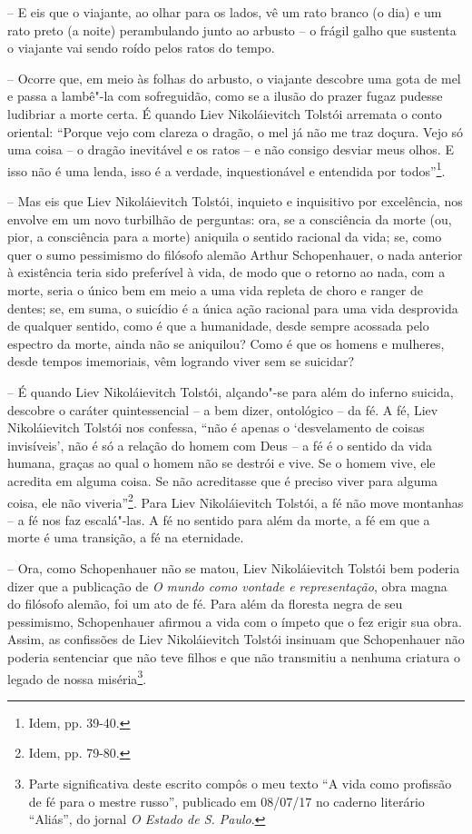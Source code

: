 -- E eis que o viajante, ao olhar para os lados, vê um rato branco (o
dia) e um rato preto (a noite) perambulando junto ao arbusto -- o frágil
galho que sustenta o viajante vai sendo roído pelos ratos do tempo.

-- Ocorre que, em meio às folhas do arbusto, o viajante descobre uma
gota de mel e passa a lambê"-la com sofreguidão, como se a ilusão do
prazer fugaz pudesse ludibriar a morte certa. É quando Liev
Nikoláievitch Tolstói arremata o conto oriental: ``Porque vejo com
clareza o dragão, o mel já não me traz doçura. Vejo só uma coisa -- o
dragão inevitável e os ratos -- e não consigo desviar meus olhos. E isso
não é uma lenda, isso é a verdade, inquestionável e entendida por
todos''\footnote{Idem, pp. 39-40.}.

-- Mas eis que Liev Nikoláievitch Tolstói, inquieto e inquisitivo por
excelência, nos envolve em um novo turbilhão de perguntas: ora, se a
consciência da morte (ou, pior, a consciência para a morte) aniquila o
sentido racional da vida; se, como quer o sumo pessimismo do filósofo
alemão Arthur Schopenhauer, o nada anterior à existência teria sido
preferível à vida, de modo que o retorno ao nada, com a morte, seria o
único bem em meio a uma vida repleta de choro e ranger de dentes; se, em
suma, o suicídio é a única ação racional para uma vida desprovida de
qualquer sentido, como é que a humanidade, desde sempre acossada pelo
espectro da morte, ainda não se aniquilou? Como é que os homens e
mulheres, desde tempos imemoriais, vêm logrando viver sem se suicidar?

-- É quando Liev Nikoláievitch Tolstói, alçando"-se para além do inferno
suicida, descobre o caráter quintessencial -- a bem dizer, ontológico --
da fé. A fé, Liev Nikoláievitch Tolstói nos confessa, ``não é apenas o
`desvelamento de coisas invisíveis', não é só a relação do homem com
Deus -- a fé é o sentido da vida humana, graças ao qual o homem não se
destrói e vive. Se o homem vive, ele acredita em alguma coisa. Se não
acreditasse que é preciso viver para alguma coisa, ele não
viveria''\footnote{Idem, pp. 79-80.}. Para Liev Nikoláievitch Tolstói, a
fé não move montanhas -- a fé nos faz escalá"-las. A fé no sentido para
além da morte, a fé em que a morte é uma transição, a fé na eternidade.

-- Ora, como Schopenhauer não se matou, Liev Nikoláievitch Tolstói bem
poderia dizer que a publicação de \emph{O mundo como vontade e
representação}, obra magna do filósofo alemão, foi um ato de fé. Para
além da floresta negra de seu pessimismo, Schopenhauer afirmou a vida
com o ímpeto que o fez erigir sua obra. Assim, as confissões de Liev
Nikoláievitch Tolstói insinuam que Schopenhauer não poderia sentenciar
que não teve filhos e que não transmitiu a nenhuma criatura o legado de
nossa miséria\footnote{Parte significativa deste escrito compôs o meu
  texto ``A vida como profissão de fé para o mestre russo'', publicado
  em 08/07/17 no caderno literário ``Aliás'', do jornal \emph{O Estado
  de S. Paulo}.}.

